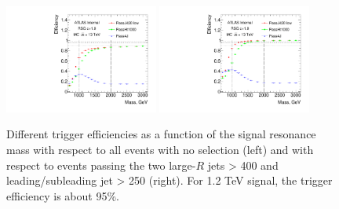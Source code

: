 \begin{figure}[htbp!]
\begin{center}
  \includegraphics[width=0.45\textwidth,angle=-90]{figures/boosted/Trigger/app_trig_b77_Efficiency_PreSel.pdf}
  \includegraphics[width=0.45\textwidth,angle=-90]{figures/boosted/Trigger/app_trig_b77_Efficiency_All.pdf}
  \caption{Different trigger efficiencies as a function of the signal resonance mass with respect to all events with no selection (left) and with respect to events passing the two large-$R$ jets \pt > 400 \GeV and leading/subleading jet \pt > 250 \GeV (right). For 1.2 TeV signal, the trigger efficiency is about 95\%.}
  \label{fig:boosted-trigger-HLT}
\end{center}
\end{figure}

\label{evt-sel:trig}
